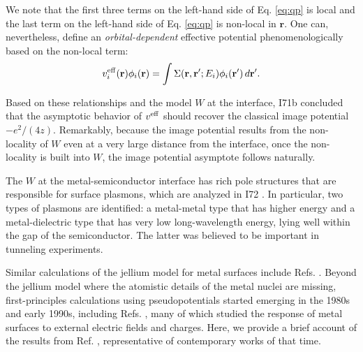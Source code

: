 \documentclass[aip, amsmath, amssymb, reprint, longbibliography]{revtex4-2}
\def\mr{\mathbf{r}}
\begin{document}
We note that the first three terms on the left-hand side of Eq. \eqref{eq:qp} is local and the last term on the left-hand side of Eq. \eqref{eq:qp} is non-local in $\mathbf{r}$. One can, nevertheless, define an \emph{orbital-dependent} effective potential phenomenologically based on the non-local term:
\begin{equation}
v_{i}^{\rm eff}(\mr)\phi_i(\mr)=\int \Sigma(\mr,\mr';E_i)\phi_i(\mr')\,d\mr'.
\label{eq:effpot}
\end{equation}

Based on these relationships and the model $W$ at the interface, I71b concluded that the asymptotic behavior of $v^{\rm eff}$ should recover the classical image potential $-e^2/(4z)$. Remarkably, because the image potential results from the non-locality of $W$ even at a very large distance from the interface, once the non-locality is built into $W$, the image potential asymptote follows naturally. 

The $W$ at the metal-semiconductor interface has rich pole structures that are responsible for surface plasmons, which are analyzed in I72 \cite{I72}. In particular, two types of plasmons are identified: a metal-metal type that has higher energy and a metal-dielectric type that has very low long-wavelength energy, lying well within the gap of the semiconductor. The latter was believed to be important in tunneling experiments. 

Similar calculations of the jellium model for metal surfaces include Refs. . Beyond the jellium model where the atomistic details of the metal nuclei are missing, first-principles calculations using pseudopotentials started emerging in the 1980s and early 1990s, including Refs. , many of which studied the response of metal surfaces to external electric fields and charges. Here, we provide a brief account of the results from Ref. , representative of contemporary works of that time. 
\end{document}

